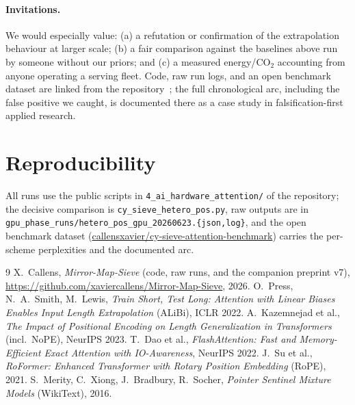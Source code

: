 \documentclass[11pt,a4paper]{article}
\begin{document}
\paragraph{Invitations.} We would especially value: (a) a refutation or
confirmation of the extrapolation behaviour at larger scale; (b) a fair
comparison against the baselines above run by someone without our priors; and (c)
a measured energy/$\mathrm{CO_2}$ accounting from anyone operating a serving
fleet. Code, raw run logs, and an open benchmark dataset are linked from the
repository~\cite{mms}; the full chronological arc, including the false positive we
caught, is documented there as a case study in falsification-first applied
research.

\section*{Reproducibility}
All runs use the public scripts in \texttt{4\_ai\_hardware\_attention/} of the
repository; the decisive comparison is \texttt{cy\_sieve\_hetero\_pos.py}, raw
outputs are in \texttt{gpu\_phase\_runs/hetero\_pos\_gpu\_20260623.\{json,log\}},
and the open benchmark dataset
(\href{https://huggingface.co/datasets/callensxavier/cy-sieve-attention-benchmark}{callensxavier/cy-sieve-attention-benchmark})
carries the per-scheme perplexities and the documented arc.

\begin{thebibliography}{9}
 X.~Callens, \emph{Mirror-Map-Sieve} (code, raw runs, and the
  companion preprint v7), \url{https://github.com/xaviercallens/Mirror-Map-Sieve},
  2026.
 O.~Press, N.~A.~Smith, M.~Lewis, \emph{Train Short, Test Long:
  Attention with Linear Biases Enables Input Length Extrapolation} (ALiBi),
  ICLR 2022.
 A.~Kazemnejad et al., \emph{The Impact of Positional Encoding on
  Length Generalization in Transformers} (incl.\ NoPE), NeurIPS 2023.
 T.~Dao et al., \emph{FlashAttention: Fast and Memory-Efficient
  Exact Attention with IO-Awareness}, NeurIPS 2022.
 J.~Su et al., \emph{RoFormer: Enhanced Transformer with Rotary
  Position Embedding} (RoPE), 2021.
 S.~Merity, C.~Xiong, J.~Bradbury, R.~Socher, \emph{Pointer
  Sentinel Mixture Models} (WikiText), 2016.
\end{thebibliography}
\end{document}

